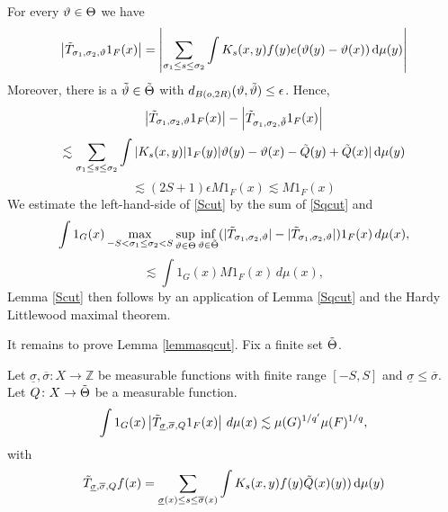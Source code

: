 For every $\vartheta\in \Theta$ we have
\begin{equation}
\left| \Tilde{T}_{\sigma_1,\sigma_2,\vartheta} 1_{F}(x)\right|=
\left|\sum_{\sigma_1 \le s\le \sigma_2}
\int K_s(x,y)  f(y) e(\vartheta(y)-{\vartheta(x)}) \, \mathrm{d}\mu(y)\right|
\end{equation}
Moreover, there is a $\tilde{\vartheta}
\in \tilde{\Theta}$ with $d_{B(o,2R)}(\vartheta,\tilde{\vartheta})\le \epsilon$. Hence,
\begin{equation}
    \left| \Tilde{T}_{\sigma_1,\sigma_2,\vartheta} 1_{F}(x)\right|-\left|\Tilde{T}_{\sigma_1,\sigma_2,\tilde{\vartheta}} 1_{F}(x) \right|
\end{equation}
\begin{equation}
    \lesssim
    \sum_{\sigma_1 \le s\le \sigma_2}
\int |K_s(x,y)|  1_F(y) |\vartheta(y)-{\vartheta(x)}
-{\tilde{Q}(y)}+{\tilde{Q}(x)}| \, \mathrm{d}\mu(y)
\end{equation}
\begin{equation}
    \lesssim  (2S+1) \epsilon M1_F(x)\lesssim  M1_F(x)
\end{equation}
We estimate the left-hand-side of \eqref{Scut} by
the sum of \eqref{Sqcut} and
    \begin{equation}
    \int 1_{G}(x)
\max_{-S<\sigma_1\le \sigma_2<S}\sup_{\vartheta\in {\Theta}}
\inf_{\vartheta\in\tilde{\Theta}}
(| \Tilde{T}_{\sigma_1,\sigma_2,\vartheta}|-|\Tilde{T}_{\sigma_1,\sigma_2,\vartheta}  |)1_{F}(x)\, d\mu(x)
,
\end{equation}
\begin{equation}
    \lesssim
        \int 1_{G}(x)
M1_{F}(x)\, d\mu(x)
,
\end{equation}
Lemma \ref{Scut} then follows by an application of Lemma \ref{Sqcut} and
the Hardy Littlewood maximal theorem.


It remains to prove Lemma \ref{lemmasqcut}.
Fix a finite set
$\tilde{\Theta}$.
\begin{lemma}\label{lemmasqlin}
Let $\underline{\sigma},\overline\sigma\colon X\to \mathbb{Z}$ be measurable functions with finite range
$[-S,S]$ and $\underline{\sigma}\leq \overline \sigma$. Let ${Q}\colon X\to {\tilde{\Theta}}$ be a measurable function.
    \begin{equation}  \label{Sqlin}
    \int 1_{G}(x)
\left| \Tilde{T}_{\underline{\sigma},\overline{\sigma},{Q}}1_F(x)
    \right|\, d\mu(x)
\lesssim \mu(G)^{1/q'} \mu(F)^{1/q},
\end{equation}
with
\begin{equation}\label{middles1}
\Tilde{T}_{\underline{\sigma},\overline{\sigma},{Q}}f(x)=\sum_{\underline{\sigma}(x) \le s\le \overline{\sigma}(x)}
\int K_s(x,y)  f(y)\tilde{Q}(x)(y)) \, \mathrm{d}\mu(y)
\end{equation}
\end{lemma}


